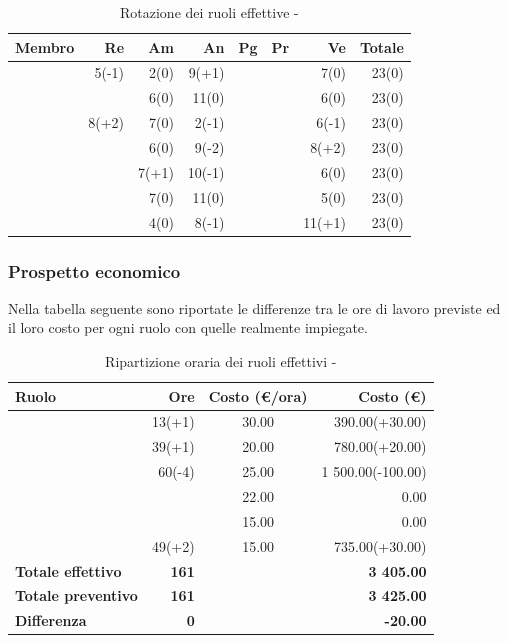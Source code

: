 \documentclass[12pt,a4paper]{article}
\begin{document}
\begin{table}[H]
	\begin{center}
		\begin{tabular}{l r r r r r r r}
			\toprule
			\textbf{Membro}	&	\textbf{Re}	&	\textbf{Am}	& \textbf{An} & \textbf{Pg} & \textbf{Pr} & \textbf{Ve} & \textbf{Totale}\\
			\midrule
			\midrule
			\IB{} & 5(-1) & 2(0) & 9(+1) & & & 7(0) & 23(0) \\
			\midrule
			\AB{} & & 6(0) & 11(0) & & & 6(0) & 23(0) \\
			\midrule
			\NDC{} & 8(+2) & 7(0) & 2(-1) & & & 6(-1) & 23(0) \\
			\midrule
			\TP{} & & 6(0) & 9(-2) & & & 8(+2) & 23(0) \\
			\midrule
			\WS{} & & 7(+1) & 10(-1) & & & 6(0) & 23(0) \\
			\midrule
			\AVE{} & & 7(0) & 11(0) & & & 5(0) & 23(0) \\
			\midrule
			\AVI{} & & 4(0) & 8(-1) & & & 11(+1) & 23(0) \\
			\bottomrule
		\end{tabular}
		\caption{Rotazione dei ruoli effettive - \FA{}}
	\end{center}
\end{table}

\subsubsection{Prospetto economico}
Nella tabella seguente sono riportate le differenze tra le ore di lavoro previste ed il loro costo per ogni ruolo con quelle realmente impiegate.

\begin{table}[H]
	\begin{center}
		\begin{tabular}{l r c r}
			\toprule
			\textbf{Ruolo}	& \textbf{Ore} & \textbf{Costo (\euro/ora)}	& \textbf{Costo (\euro)} \\
			\midrule
			\midrule
			\RE{} & 13(+1) & 30.00 & 390.00(+30.00)\\
			\midrule
			\AM{} & 39(+1) & 20.00 & 780.00(+20.00)\\ 
			\midrule
			\AN{} & 60(-4) & 25.00 & 1 500.00(-100.00)\\ 
			\midrule
			\PG{} & & 22.00 & 0.00\\ 
			\midrule
			\PR{} & & 15.00 & 0.00\\ 
			\midrule
			\VR{} & 49(+2) & 15.00 & 735.00(+30.00)\\ 
			\midrule
			\midrule
			\textbf{Totale effettivo} & \textbf{161} &  & \textbf{3 405.00}\\
			\midrule
			\textbf{Totale preventivo} & \textbf{161} &  & \textbf{3 425.00}\\
			\midrule
			\textbf{Differenza} & \textbf{0} &  & \textbf{-20.00}\\
			\bottomrule
		\end{tabular}
		\caption{Ripartizione oraria dei ruoli effettivi - \FA{}}
	\end{center}
\end{table}
\end{document}
